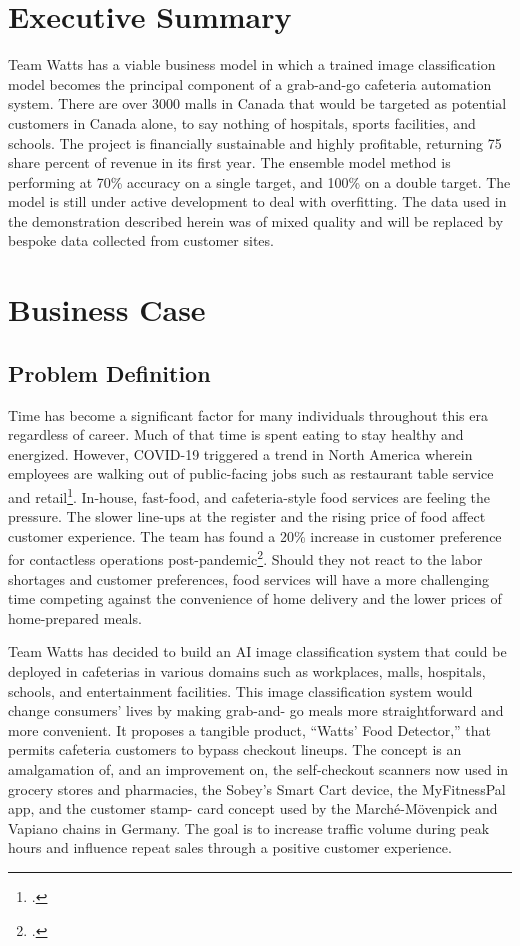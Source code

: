 \section{Executive Summary}
Team Watts has a viable business model in which a trained image classification model becomes the principal component of a grab-and-go cafeteria automation system. There are over 3000 malls in Canada that would be targeted as potential customers in Canada alone, to say nothing of hospitals, sports facilities, and schools. The project is financially sustainable and highly profitable, returning 75 share percent of revenue in its first year. The ensemble model method is performing at 70\% accuracy on a single target, and 100\% on a double target. The model is still under active development to deal with overfitting. The data used in the demonstration described herein was of mixed quality and will be replaced by bespoke data collected from customer sites.

\section{Business Case}
\subsection{Problem Definition}
Time has become a significant factor for many individuals throughout this era regardless of career. Much of that time is spent eating to stay healthy and energized. However, COVID-19 triggered a trend in North America wherein employees are walking out of public-facing jobs such as restaurant table service and retail\footcite{petro}. In-house, fast-food, and cafeteria-style food services are feeling the pressure. The slower line-ups at the register and the rising price of food affect customer experience. The team has found a 20\% increase in customer preference for contactless operations post-pandemic\footcite{neal}. Should they not react to the labor shortages and customer preferences, food services will have a more challenging time competing against the convenience of home delivery and the lower prices of home-prepared meals.

Team Watts has decided to build an AI image classification system that could be deployed in cafeterias in various domains such as workplaces, malls, hospitals, schools, and entertainment facilities. This image classification system would change consumers’ lives by making grab-and- go meals more straightforward and more convenient. It proposes a tangible product, “Watts’ Food Detector,” that permits cafeteria customers to bypass checkout lineups. The concept is an amalgamation of, and an improvement on, the self-checkout scanners now used in grocery stores and pharmacies, the Sobey’s Smart Cart device, the MyFitnessPal app, and the customer stamp- card concept used by the Marché-Mövenpick and Vapiano chains in Germany. The goal is to increase traffic volume during peak hours and influence repeat sales through a positive customer experience.

